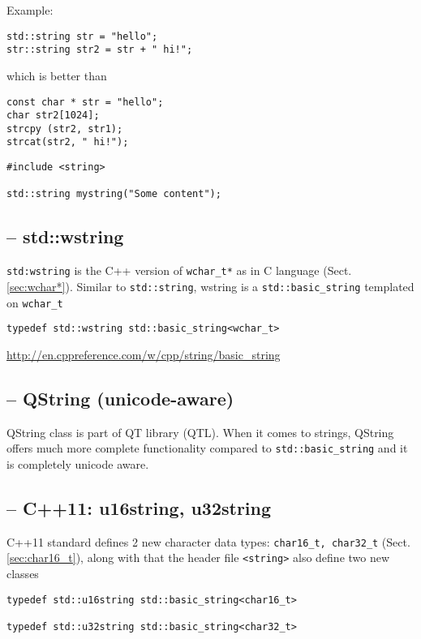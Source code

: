 Example:
\begin{verbatim}
std::string str = "hello";
str::string str2 = str + " hi!";
\end{verbatim}
which is better than
\begin{verbatim}
const char * str = "hello";
char str2[1024];
strcpy (str2, str1);
strcat(str2, " hi!");
\end{verbatim}


% 
\begin{verbatim}
#include <string>

std::string mystring("Some content");
\end{verbatim}


\subsection{-- std::wstring}
\label{sec:std::wstring}

\verb!std:wstring! is the C++ version of \verb!wchar_t*! as in C language
(Sect.\ref{sec:wchar*}). Similar to \verb!std::string!, wstring is a
\verb!std::basic_string! templated on \verb!wchar_t!
\begin{Verbatim}
typedef std::wstring std::basic_string<wchar_t>
\end{Verbatim}
\url{http://en.cppreference.com/w/cpp/string/basic_string}

\subsection{-- QString (unicode-aware)}
\label{sec:QString}

QString class is part of QT library (QTL).
When it comes to strings, QString offers much more complete functionality
compared to \verb!std::basic_string! and it is completely unicode aware.


\subsection{-- C++11: u16string, u32string}
\label{sec:u16string}
\label{sec:u32string}

C++11 standard defines 2 new character data types: \verb!char16_t, char32_t!
(Sect.\ref{sec:char16_t}), along with that the header file \verb!<string>! also
define two new classes
\begin{verbatim}
typedef std::u16string std::basic_string<char16_t>

typedef std::u32string std::basic_string<char32_t>
\end{verbatim}


